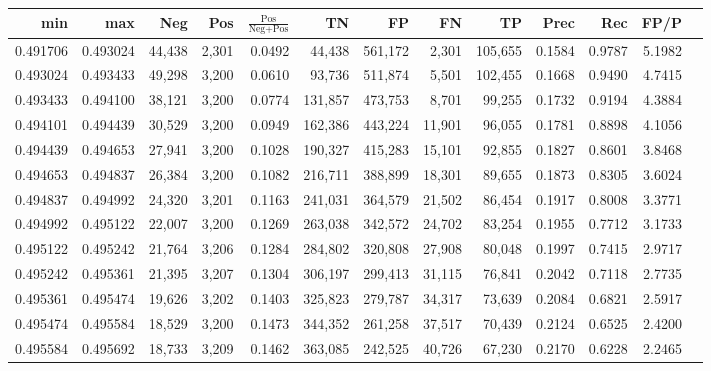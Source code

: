 \begin{tabular}{rrrrrrrrrrrrr}
\toprule
     min &      max &    Neg &   Pos & $\frac{\text{Pos}}{\text{Neg}+\text{Pos}}$ &      TN &      FP &      FN &      TP &   Prec &    Rec &   FP/P \\
\midrule
0.491706 & 0.493024 & 44,438 & 2,301 &                                     0.0492 &  44,438 & 561,172 &   2,301 & 105,655 & 0.1584 & 0.9787 & 5.1982 \\
0.493024 & 0.493433 & 49,298 & 3,200 &                                     0.0610 &  93,736 & 511,874 &   5,501 & 102,455 & 0.1668 & 0.9490 & 4.7415 \\
0.493433 & 0.494100 & 38,121 & 3,200 &                                     0.0774 & 131,857 & 473,753 &   8,701 &  99,255 & 0.1732 & 0.9194 & 4.3884 \\
0.494101 & 0.494439 & 30,529 & 3,200 &                                     0.0949 & 162,386 & 443,224 &  11,901 &  96,055 & 0.1781 & 0.8898 & 4.1056 \\
0.494439 & 0.494653 & 27,941 & 3,200 &                                     0.1028 & 190,327 & 415,283 &  15,101 &  92,855 & 0.1827 & 0.8601 & 3.8468 \\
0.494653 & 0.494837 & 26,384 & 3,200 &                                     0.1082 & 216,711 & 388,899 &  18,301 &  89,655 & 0.1873 & 0.8305 & 3.6024 \\
0.494837 & 0.494992 & 24,320 & 3,201 &                                     0.1163 & 241,031 & 364,579 &  21,502 &  86,454 & 0.1917 & 0.8008 & 3.3771 \\
0.494992 & 0.495122 & 22,007 & 3,200 &                                     0.1269 & 263,038 & 342,572 &  24,702 &  83,254 & 0.1955 & 0.7712 & 3.1733 \\
0.495122 & 0.495242 & 21,764 & 3,206 &                                     0.1284 & 284,802 & 320,808 &  27,908 &  80,048 & 0.1997 & 0.7415 & 2.9717 \\
0.495242 & 0.495361 & 21,395 & 3,207 &                                     0.1304 & 306,197 & 299,413 &  31,115 &  76,841 & 0.2042 & 0.7118 & 2.7735 \\
0.495361 & 0.495474 & 19,626 & 3,202 &                                     0.1403 & 325,823 & 279,787 &  34,317 &  73,639 & 0.2084 & 0.6821 & 2.5917 \\
0.495474 & 0.495584 & 18,529 & 3,200 &                                     0.1473 & 344,352 & 261,258 &  37,517 &  70,439 & 0.2124 & 0.6525 & 2.4200 \\
0.495584 & 0.495692 & 18,733 & 3,209 &                                     0.1462 & 363,085 & 242,525 &  40,726 &  67,230 & 0.2170 & 0.6228 & 2.2465 \\

\end{tabular}
